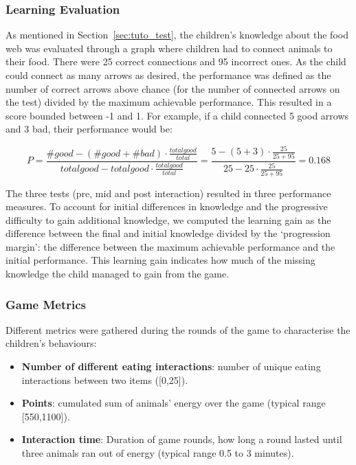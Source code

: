 \subsubsection{Learning Evaluation} \label{sec:tuto_perf}

As mentioned in Section~\ref{sec:tuto_test}, the children's knowledge about the food web was evaluated through a graph where children had to connect animals to their food. There were 25 correct connections and 95 incorrect ones. As the child could connect as many arrows as desired, the performance was defined as the number of correct arrows above chance (for the number of connected arrows on the test) divided by the maximum achievable performance. This resulted in a score bounded between -1 and 1. For example, if a child connected 5 good arrows and 3 bad, their performance would be:

\begin{equation}
P=\frac{\#good-(\#good+\#bad) \cdot \frac{total good}{total}}{total good - total good \cdot \frac{total good}{total}} = \frac{5-(5+3) \cdot \frac{25}{25+95}}{25 - 25 \cdot \frac{25}{25+95}}=0.168
\end{equation}
			
The three tests (pre, mid and post interaction) resulted in three performance measures. To account for initial differences in knowledge and the progressive difficulty to gain additional knowledge, we computed the learning gain as the difference between the final and initial knowledge divided by the `progression margin': the difference between the maximum achievable performance and the initial performance. This learning gain indicates how much of the missing knowledge the child managed to gain from the game.
			
\subsubsection{Game Metrics}

Different metrics were gathered during the rounds of the game to characterise the children's behaviours:
\begin{itemize}
	\item \textbf{Number of different eating interactions}: number of unique eating interactions between two items ([0,25]).
	\item \textbf{Points}: cumulated sum of animals' energy over the game (typical range [550,1100]).
	\item \textbf{Interaction time}: Duration of game rounds, how long a round lasted until three animals ran out of energy (typical range 0.5 to 3 minutes).
\end{itemize}

